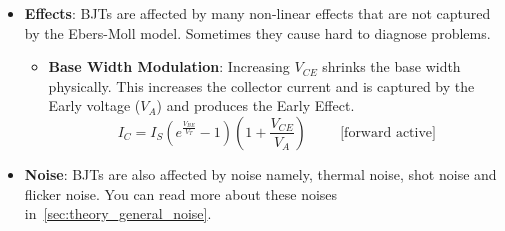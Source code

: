 \begin{itemize}
  \item \textbf{Effects}:
    BJTs are affected by many non-linear effects that are not captured by
    the Ebers-Moll model. Sometimes they cause hard to diagnose problems.
    \begin{itemize}
        \item \textbf{Base Width Modulation}: Increasing \(V_{CE}\) shrinks the base
          width physically. This increases the collector current and is captured
          by the Early voltage (\(V_A\)) and produces the Early Effect.
          \[
            I_C = I_{S} \left( e^{\frac{V_{BE}}{V_T}} - 1 \right) \left( 1 + \frac{V_{CE}}{V_A} \right) \hspace{1cm} \text{[forward active]}
          \]
    \end{itemize}
  \item \textbf{Noise}:
      BJTs are also affected by noise namely, thermal noise, shot noise and flicker
      noise. You can read more about these noises in~\ref{sec:theory_general_noise}.
\end{itemize}
